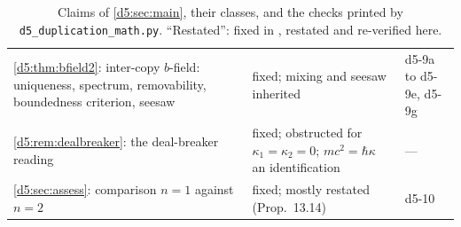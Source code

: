\begin{table}[t]
\begin{tabular}{@{}>{\raggedright\arraybackslash}p{8.1cm}>{\raggedright\arraybackslash}p{5.0cm}>{\raggedright\arraybackslash}p{2.0cm}@{}}
\cref{d5:thm:bfield2}: inter-copy $b$-field: uniqueness, spectrum, removability, boundedness criterion, seesaw & fixed; mixing and seesaw inherited & d5-9a to d5-9e, d5-9g\\
\cref{d5:rem:dealbreaker}: the deal-breaker reading & fixed; obstructed for $\kappa_1=\kappa_2=0$; $mc^2=\hbar\kappa$ an identification & ---\\
\cref{d5:sec:assess}: comparison $n=1$ against $n=2$ & fixed; mostly restated (Prop.~13.14) & d5-10\\
\bottomrule
\end{tabular}
\caption{Claims of \cref{d5:sec:main}, their classes, and the checks printed by \texttt{d5\_duplication\_math.py}. ``Restated'': fixed in
\cite{ES17}, restated and re-verified here.}
\label{d5:tab:claims}
\end{table}
